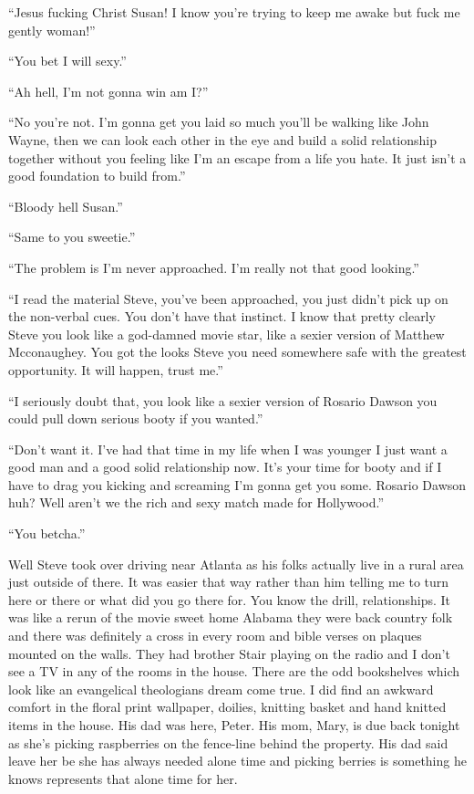 ``Jesus fucking Christ Susan! I know you're trying to keep me awake but fuck me gently woman!''

``You bet I will sexy.''

``Ah hell, I'm not gonna win am I?''

``No you're not. I'm gonna get you laid so much you'll be walking like John Wayne, then we can look each other in the eye and build a solid relationship together without you feeling like I'm an escape from a life you hate. It just isn't a good foundation to build from.''

``Bloody hell Susan.''

``Same to you sweetie.''

``The problem is I'm never approached. I'm really not that good looking.''

``I read the material Steve, you've been approached, you just didn't pick up on the non-verbal cues. You don't have that instinct. I know that pretty clearly Steve you look like a god-damned movie star, like a sexier version of Matthew Mcconaughey. You got the looks Steve you need somewhere safe with the greatest opportunity. It will happen, trust me.''

``I seriously doubt that, you look like a sexier version of Rosario Dawson you could pull down serious booty if you wanted.''

``Don't want it. I've had that time in my life when I was younger I just want a good man and a good solid relationship now. It's your time for booty and if I have to drag you kicking and screaming I'm gonna get you some. Rosario Dawson huh? Well aren't we the rich and sexy match made for Hollywood.''

``You betcha.''

\parasep

Well Steve took over driving near Atlanta as his folks actually live in a rural area just outside of there. It was easier that way rather than him telling me to turn here or there or what did you go there for. You know the drill, relationships. It was like a rerun of the movie sweet home Alabama they were back country folk and there was definitely a cross in every room and bible verses on plaques mounted on the walls. They had brother Stair playing on the radio and I don't see a TV in any of the rooms in the house. There are the odd bookshelves which look like an evangelical theologians dream come true. I did find an awkward comfort in the floral print wallpaper, doilies, knitting basket and hand knitted items in the house. His dad was here, Peter. His mom, Mary, is due back tonight as she's picking raspberries on the fence-line behind the property. His dad said leave her be she has always needed alone time and picking berries is something he knows represents that alone time for her.

